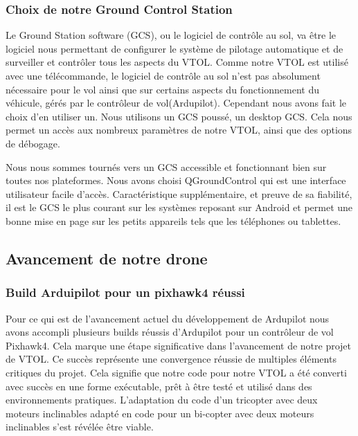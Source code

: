 \documentclass[a4paper,12pt,french]{report}
\begin{document}
\subsubsection{Choix de notre Ground Control Station}

Le Ground Station software (GCS),  ou le logiciel de contrôle au sol, va être le logiciel nous permettant de configurer le système de pilotage automatique et de surveiller et contrôler tous les aspects du VTOL. Comme notre VTOL est utilisé avec une télécommande, le logiciel de contrôle au sol n’est pas absolument nécessaire pour le vol ainsi que sur certains aspects du fonctionnement du véhicule, gérés par le contrôleur de vol(Ardupilot). Cependant nous avons fait le choix d’en utiliser un. Nous utilisons un GCS poussé, un desktop GCS. Cela nous permet un accès aux nombreux paramètres de notre VTOL, ainsi que des options de débogage.\newline

Nous nous sommes tournés vers un GCS accessible et fonctionnant bien sur toutes nos plateformes. Nous avons choisi QGroundControl qui est une interface utilisateur facile d’accès. Caractéristique supplémentaire, et preuve de sa fiabilité, il est le GCS le plus courant sur les systèmes reposant sur Android et permet une bonne mise en page sur les petits appareils tels que les téléphones ou tablettes.

\subsection{Avancement de notre drone}

\subsubsection{Build Arduipilot pour un pixhawk4 réussi}

Pour ce qui est de l’avancement actuel du développement de Ardupilot nous avons accompli plusieurs builds réussis d'Ardupilot pour un contrôleur de vol Pixhawk4. Cela marque une étape significative dans l’avancement de notre projet de VTOL. Ce succès représente une convergence réussie de multiples éléments critiques du projet. Cela signifie que notre code pour notre VTOL a été converti avec succès en une forme exécutable, prêt à être testé et utilisé dans des environnements pratiques. L’adaptation du code d’un tricopter avec deux moteurs inclinables adapté en code pour un bi-copter avec deux moteurs inclinables s’est révélée être viable.\newline
\end{document}
